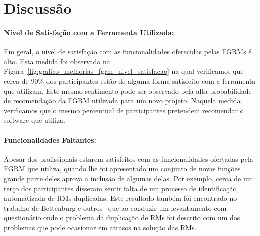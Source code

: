 \begin{table}[htpb]
\centering
{}
\caption{Classificação das funcionalidades que possam dar suporte ao uso das
metodologias dos agilistas.}
\label{tab:melhorias_fgrm_suporte_particas_ageis}
\end{table}

\section{Discussão}

\paragraph{Nível de Satisfação com a Ferramenta Utilizada:}
\label{par:pesq_profissionais_nivel_de_satisfação}

Em geral, o nível de satisfação com as funcionalidades oferecidas pelas FGRMs é
alto. Esta medida foi observada na
Figura~\ref{fig:grafico_melhorias_fgrm_nivel_satisfacao} na qual verificamos que
cerca de 90\% dos participantes estão de alguma forma satisfeito com a
ferramenta que utilizam. Este mesmo sentimento pode ser observado pela alta
probabilidade de recomendação da FGRM utilizada para um novo projeto. Naquela
medida verificamos que o mesmo percentual de participantes pretendem recomendar
o software que utiliza.

\paragraph{Funcionalidades Faltantes:}
\label{par:pesq_profissionais_funcionalidades_faltantes}

Apesar dos profissionais estarem satisfeitos com as funcionalidades ofertadas
pela FGRM que utiliza, quando lhe foi apresentado um conjunto de novas funções
grande parte deles aprova a inclusão de algumas delas. Por exemplo, cerca de um
terço dos participantes disseram sentir falta de um processo de identificação
automatizada de RMs duplicadas. Este resultado também foi encontrado no trabalho
de Bettenburg e outros~\cite{bettenburg2008makes} que ao conduzir um
levantamento com questionário onde o problema da duplicação de RMs foi descrito
com um dos problemas que pode ocasionar em atrasos na solução das RMs.


